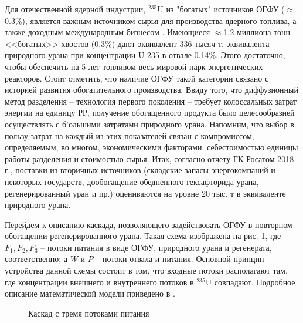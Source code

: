 Для отечественной ядерной индустрии, $^{235}$U из "богатых" источников ОГФУ ($\approx$0.3\%), является важным источником сырья для производства ядерного топлива, а также доходным международным бизнесом \cite{oecdManagementDepletedUranium2001}. Имеющиеся $\approx$1.2 миллиона тонн <<богатых>> хвостов (0.3\%) дают эквивалент 336 тысяч т. эквивалента природного урана при концентрации U-235 в отвале 0.14\%. Этого достаточно, чтобы обеспечить на 5 лет топливом весь мировой парк энергетических реакторов.
Стоит отметить, что наличие ОГФУ такой категории связано с историей развития обогатительного производства. Ввиду того, что диффузионный метод разделения -- технология первого поколения -- требует колоссальных затрат энергии на единицу РР, получение обогащенного продукта было целесообразней осуществлять с б'ольшими затратами природного урана.
Напомним, что выбор в пользу затрат на каждый из этих показателей связан с компромиссом, определяемым, во многом, экономическими факторами: себестоимостью единицы работы разделения и стоимостью сырья. 
Итак, согласно отчету ГК Росатом 2018 г., поставки из вторичных источников (складские запасы энергокомпаний и некоторых государств, дообогащение обедненного гексафторида урана, регенерированный уран и пр.) оцениваются на уровне 20 тыс. т в эквиваленте природного урана.

Перейдем к описанию каскада, позволяющего задействовать ОГФУ в повторном обогащении регенерированного урана.
Такая схема изображена на рис. \ref{fig:3_inputs}, где $F_{1}, F_{2}, F_{3}$ -- потоки питания в виде ОГФУ, природного урана и регенерата, соответственно; а $W$ и $P$ -- потоки отвала и питания.
Основной принцип устройства данной схемы состоит в том, что входные потоки располагают там, где концентрации внешнего и внутреннего потоков в $^{235}$U совпадают.
Подробное описание математической модели приведено в \cite{smirnovEnrichmentRegeneratedUranium2014}.

\begin{figure}[ht]
  \caption{Каскад с тремя потоками питания}\label{fig:3_inputs}
\end{figure}

